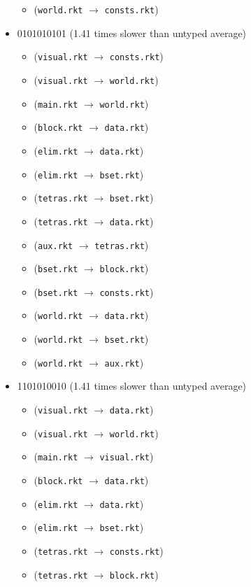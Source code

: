 \documentclass{article}
\newcommand{\mono}[1]{\texttt{#1}}
\begin{document}
\begin{itemize}
\begin{itemize}
  \item (\mono{world.rkt} $\rightarrow$ \mono{consts.rkt})
  \end{itemize}
\item 0101010101 (1.41 times slower than untyped average)
  \begin{itemize}
  \item (\mono{visual.rkt} $\rightarrow$ \mono{consts.rkt})
  \item (\mono{visual.rkt} $\rightarrow$ \mono{world.rkt})
  \item (\mono{main.rkt} $\rightarrow$ \mono{world.rkt})
  \item (\mono{block.rkt} $\rightarrow$ \mono{data.rkt})
  \item (\mono{elim.rkt} $\rightarrow$ \mono{data.rkt})
  \item (\mono{elim.rkt} $\rightarrow$ \mono{bset.rkt})
  \item (\mono{tetras.rkt} $\rightarrow$ \mono{bset.rkt})
  \item (\mono{tetras.rkt} $\rightarrow$ \mono{data.rkt})
  \item (\mono{aux.rkt} $\rightarrow$ \mono{tetras.rkt})
  \item (\mono{bset.rkt} $\rightarrow$ \mono{block.rkt})
  \item (\mono{bset.rkt} $\rightarrow$ \mono{consts.rkt})
  \item (\mono{world.rkt} $\rightarrow$ \mono{data.rkt})
  \item (\mono{world.rkt} $\rightarrow$ \mono{bset.rkt})
  \item (\mono{world.rkt} $\rightarrow$ \mono{aux.rkt})
  \end{itemize}
\item 1101010010 (1.41 times slower than untyped average)
  \begin{itemize}
  \item (\mono{visual.rkt} $\rightarrow$ \mono{data.rkt})
  \item (\mono{visual.rkt} $\rightarrow$ \mono{world.rkt})
  \item (\mono{main.rkt} $\rightarrow$ \mono{visual.rkt})
  \item (\mono{block.rkt} $\rightarrow$ \mono{data.rkt})
  \item (\mono{elim.rkt} $\rightarrow$ \mono{data.rkt})
  \item (\mono{elim.rkt} $\rightarrow$ \mono{bset.rkt})
  \item (\mono{tetras.rkt} $\rightarrow$ \mono{consts.rkt})
  \item (\mono{tetras.rkt} $\rightarrow$ \mono{block.rkt})

\end{itemize}
\end{itemize}
\end{document}
